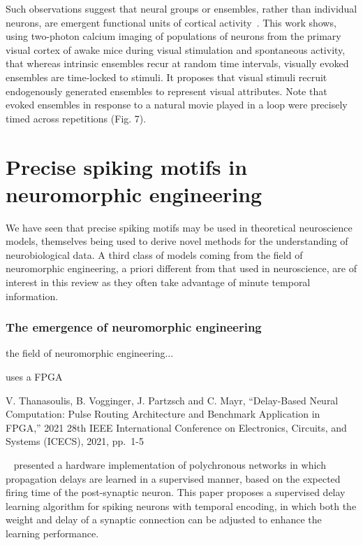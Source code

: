 \documentclass[brainsci, %
               review,submit,pdftex,moreauthors%
               ]{Definitions/mdpi}
\begin{document}
Such observations suggest that neural groups or ensembles, rather than individual neurons, are emergent functional units of cortical activity~\citep{miller_visual_2014}. This work shows, using two-photon calcium imaging of populations of neurons from the primary visual cortex of awake mice during visual stimulation and spontaneous activity, that whereas intrinsic ensembles recur at random time intervals, visually evoked ensembles are time-locked to stimuli. It proposes that visual stimuli recruit endogenously generated ensembles to represent visual attributes. Note that evoked ensembles in response to a natural movie played in a loop were precisely timed across repetitions (Fig. 7).

\section{Precise spiking motifs in neuromorphic engineering}
We have seen that precise spiking motifs may be used in theoretical neuroscience models, themselves being used to derive novel methods for the understanding of neurobiological data. 
A third class of models coming from the field of neuromorphic engineering, a priori different from that used in neuroscience, are of interest in this review as they often take advantage of minute temporal information.  

\subsubsection{The emergence of neuromorphic engineering}
the field of neuromorphic engineering...

uses a FPGA~\citep{dahlem_dynamics_2009}

V. Thanasoulis, B. Vogginger, J. Partzsch and C. Mayr, ``Delay-Based Neural Computation: Pulse Routing Architecture and Benchmark Application in FPGA,'' 2021 28th IEEE International Conference on Electronics, Circuits, and Systems (ICECS), 2021, pp.~1-5
~\citep{thanasoulis_delay-based_2021}


 ~\citet{wang_neuromorphic_2015} presented a hardware implementation of polychronous networks in which propagation delays are learned in a supervised manner, based on the expected firing time of the post-synaptic neuron. This paper proposes a supervised delay learning algorithm for spiking neurons with temporal encoding, in which both the weight and delay of a synaptic connection can be adjusted to enhance the learning performance.
\end{document}
